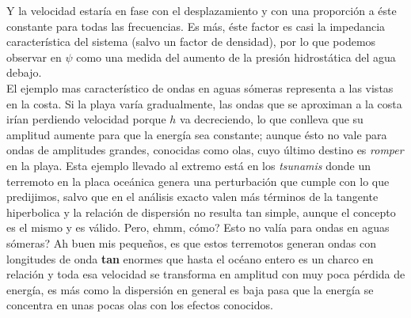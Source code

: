 \documentclass[a4paper,spanish]{article}
\numberwithin{equation}{section}
\begin{document}
Y la velocidad estar\'ia en fase con el desplazamiento y con una proporci\'on a \'este constante para todas las frecuencias. Es m\'as, \'este factor es casi la impedancia caracter\'istica del sistema (salvo un factor de densidad), por lo que podemos observar en $\psi$ como una medida del aumento de la presi\'on hidrost\'atica del agua debajo.\\
El ejemplo mas caracter\'istico de ondas en aguas s\'omeras representa a las vistas en la costa. Si la playa var\'ia gradualmente, las ondas que se aproximan a la costa ir\'ian perdiendo velocidad porque $h$ va decreciendo, lo que conlleva que su amplitud aumente para que la energ\'ia sea constante; aunque \'esto no vale para ondas de amplitudes grandes, conocidas como olas, cuyo \'ultimo destino es \textit{romper} en la playa. Esta ejemplo llevado al extremo est\'a en los \textit{tsunamis} donde un terremoto en la placa oce\'anica genera una perturbaci\'on que cumple con lo que predijimos, salvo  que en el an\'alisis exacto valen m\'as t\'erminos de la tangente hiperbolica y la relaci\'on de dispersi\'on no resulta tan simple, aunque el concepto es el mismo y es v\'alido. Pero, ehmm, c\'omo? Esto no val\'ia para ondas en aguas s\'omeras?   Ah buen mis peque\~nos, es que estos terremotos generan ondas con longitudes de onda \textbf{tan} enormes que hasta el oc\'eano entero es un charco en relaci\'on y toda esa velocidad se transforma en amplitud con muy poca p\'erdida de energ\'ia, es m\'as como la dispersi\'on en general es baja pasa que la energ\'ia se concentra en unas pocas olas con los efectos conocidos.
\end{document}
